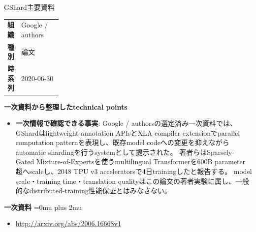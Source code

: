 \begin{technicalnote}{GShard}{主要資料}
\begingroup
\begin{tabularx}{\linewidth}{@{}>{\bfseries}p{0.22\linewidth}X@{}}
組織 & Google / authors \\
種別 & 論文 \\
時系列 & 2020-06-30 \\
\end{tabularx}
\smallskip
{\bfseries 一次資料から整理したtechnical points}
\begin{itemize}[leftmargin=1.5em,itemsep=0.35em]
\item \textbf{一次情報で確認できる事実}: Google / authorsの選定済み一次資料では、GShardはlightweight annotation APIsとXLA compiler extensionでparallel computation patternを表現し、既存model codeへの変更を抑えながらautomatic shardingを行うsystemとして提示された。 著者らはSparsely-Gated Mixture-of-Expertsを使うmultilingual Transformerを600B parameter超へscaleし、2048 TPU v3 acceleratorsで4日trainingしたと報告する。 model scale・training time・translation qualityはこの論文の著者実験に属し、一般的なdistributed-training性能保証とはみなさない。
\end{itemize}
\begin{minipage}{\linewidth}
\begin{samepage}
{\bfseries 一次資料}
\begingroup\sloppy
\Urlmuskip=0mu plus 2mu\relax
\begin{itemize}[leftmargin=1.5em,itemsep=0.25em]
\item {\scriptsize\url{http://arxiv.org/abs/2006.16668v1}}
\end{itemize}
\endgroup
\end{samepage}
\end{minipage}
\endgroup
\end{technicalnote}
\medskip
